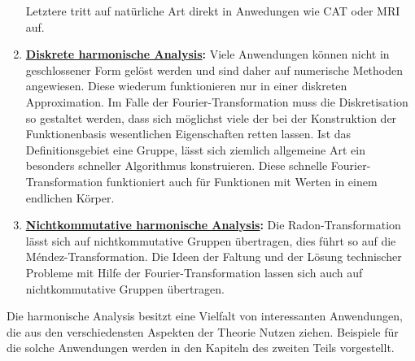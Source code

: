 \begin{enumerate}
Letztere tritt auf natürliche Art direkt in Anwedungen
wie CAT oder MRI auf.
%
%
\item {\bf \hyperref[buch:chapter:diskret]{Diskrete harmonische Analysis}:}
Viele Anwendungen können nicht in geschlossener Form gelöst werden
und sind daher auf numerische Methoden angewiesen.
Diese wiederum funktionieren nur in einer diskreten Approximation.
Im Falle der Fourier-Transformation muss die Diskretisation so gestaltet
werden, dass sich möglichst viele der bei der Konstruktion der Funktionenbasis
wesentlichen Eigenschaften retten lassen.
Ist das Definitionsgebiet eine Gruppe, lässt sich ziemlich allgemeine
Art ein besonders schneller Algorithmus konstruieren.
Diese schnelle Fourier-Transformation funktioniert auch für Funktionen
%
mit Werten in einem endlichen Körper.
\item {\bf \hyperref[buch:chapter:nichtkomm]{Nichtkommutative harmonische Analysis}:}
Die Radon-Transformation lässt sich auf nichtkommutative Gruppen
übertragen, dies führt so auf die Méndez-Transformation.
%
Die Ideen der Faltung und der Lösung technischer Probleme mit Hilfe
der Fourier-Transformation lassen sich auch auf nichtkommutative
Gruppen übertragen.
%
\end{enumerate}

Die harmonische Analysis besitzt eine Vielfalt von interessanten
Anwendungen, die aus den verschiedensten Aspekten der Theorie
Nutzen ziehen.
Beispiele für die solche Anwendungen werden in den Kapiteln
des zweiten Teils vorgestellt.

